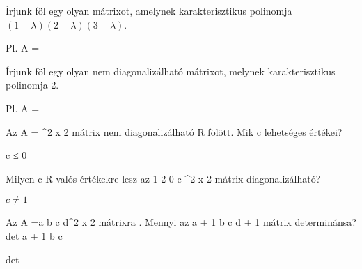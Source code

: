 \begin{frame}
  \begin{tcolorbox}[title={8/2. -N-}]
     Írjunk föl egy olyan mátrixot, amelynek karakterisztikus polinomja $(1−{\lambda})(2−{\lambda})(3−{\lambda})$.

  \tcblower

    \mmedskip 
    
     Pl. A =
  \end{tcolorbox}
\end{frame}


\begin{frame}
  \begin{tcolorbox}[title={8/3. -R-}]
    Írjunk föl egy olyan nem diagonalizálható mátrixot, melynek karakterisztikus polinomja {\lambda}2.

  \tcblower

    \mmedskip 
    
    Pl. A =
  \end{tcolorbox}
\end{frame}


\begin{frame}
  \begin{tcolorbox}[title={8/4. -Q-}]
    Az A =  \in {}^{2 x 2} mátrix nem diagonalizálható R fölött. Mik c lehetséges értékei?


  \tcblower

    \mmedskip 
    
    c ≤ 0
  \end{tcolorbox}
\end{frame}


\begin{frame}
  \begin{tcolorbox}[title={8/5. -Q-}]
    Milyen c \in R valós értékekre lesz az 1 2 0 c \in {}^{2 x 2} mátrix diagonalizálható?

  \tcblower

    \mmedskip 
    
     $c \neq 1$
  \end{tcolorbox}
\end{frame}


\begin{frame}
  \begin{tcolorbox}[title={8/6. -Q-}]
     Az A =a b c d\in {}^{2 x 2} mátrixra . Mennyi az a + 1 b c d + 1 mátrix determinánsa? det a + 1 b c 

  \tcblower

    \mmedskip 
    
     det
  \end{tcolorbox}
\end{frame}


